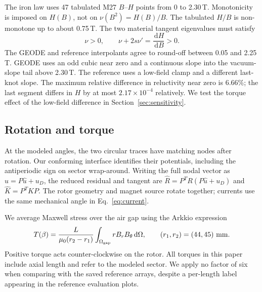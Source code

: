\documentclass{anvil-paper}
\newcommand{\dd}{\,\mathrm{d}}
\begin{document}
The iron law uses 47 tabulated M27 $B$--$H$ points from 0 to 2.30\,T.
Monotonicity is imposed on $H(B)$, not on $\nu(B^2)=H(B)/B$.
The tabulated $H/B$ is non-monotone up to about 0.75\,T.
The two material tangent eigenvalues must satisfy
\begin{equation}
 \nu>0,\qquad \nu+2s\nu'=\frac{\dd H}{\dd B}>0.
\end{equation}
The GEODE and reference interpolants agree to round-off between 0.05 and
2.25\,T. GEODE uses an odd cubic near zero and a continuous slope into the
vacuum-slope tail above 2.30\,T. The reference uses a low-field clamp and
a different last-knot slope. The maximum relative difference in
reluctivity near zero is 6.66\%; the last segment differs in $H$ by at
most $2.17\times10^{-4}$ relatively. We test the torque effect of the
low-field difference in Section~\ref{sec:sensitivity}.

\subsection{Rotation and torque}
At the modeled angles, the two circular traces have matching nodes after
rotation. Our conforming interface identifies their potentials, including
the antiperiodic sign on sector wrap-around. Writing the full nodal vector
as $u=P\hat u+u_D$, the reduced residual and tangent are
$\hat R=P^T R(P\hat u+u_D)$ and $\hat K=P^T K P$.
The rotor geometry and magnet source rotate together; currents use the
same mechanical angle in Eq.~\eqref{eq:current}.

We average Maxwell stress over the air gap using the Arkkio expression
\citep{arkkio1987}
\begin{equation}
 T(\beta)=\frac{L}{\mu_0(r_2-r_1)}
  \int_{\Omega_{\rm gap}}r B_r B_\theta\dd\Omega,
 \qquad(r_1,r_2)=(44,45)\ {\rm mm}.
 \label{eq:torque}
\end{equation}
Positive torque acts counter-clockwise on the rotor. All torques in this
paper include axial length and refer to the modeled sector. We apply no
factor of six when comparing with the saved reference arrays, despite a
per-length label appearing in the reference evaluation plots.
\end{document}
